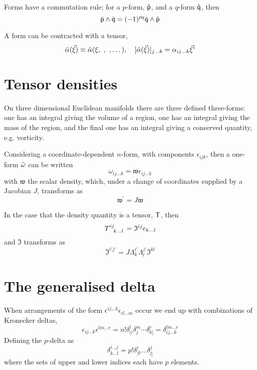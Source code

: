 Forms have a commutation rule; for a $p$-form, $\tilde{\mathsf{{p}}}$, and a
$q$-form $\tilde{\mathsf{{q}}}$, then
\begin{equation}
  \label{eq:35}
  \tilde{\mathsf{{p}}} \wedge \tilde{\mathsf{{q}}} = (-1)^{pq} \tilde{\mathsf{{q}}} \wedge \tilde{\mathsf{{p}}}
\end{equation}

A form can be contracted with a tensor,
\begin{equation}
  \label{eq:36}
  \tilde{\mathsf{{\alpha}}}(\vec{\xi}) \equiv \tilde{\mathsf{{\alpha}}}(\xi,\ , \ , \dots), \quad [\tilde{\mathsf{{\alpha}}}(\vec{\xi}) ]_{j\dots k} = \alpha_{ij \dots k} \vec{\xi}^i
\end{equation}

\section{Tensor densities}
\label{sec:tensor-densities}

On three dimensional Euclidean manifolds there are three defined
three-forms: one has an integral giving the volume of a region, one
has an integral giving the mass of the region, and the final one has
an integral giving a conserved quantity, e.g. vorticity.

Considering a coordinate-dependent $n$-form, with components
$\epsilon_{ijk}$, then a one-form $\tilde{\omega}$ can be written
\begin{equation}
  \label{eq:38}
  \omega_{ij\dots k} = \mathfrak{w} \epsilon_{ij\dots k}
\end{equation}
with $\mathfrak{w}$ the scalar density, which, under a change of
coordinates supplied by a Jacobian $J$, transforms as \[
\mathfrak{w}^{'} = J \mathfrak{w} \]

In the case that the density quantity is a tensor, $\mathsf{{T}}$, then
\[ T \indices{^{ij}_{k \dots l}} = \mathfrak{I}^{ij} \epsilon_{k \dots l} \]
and $\mathfrak{I}$ transforms as
\[ \mathfrak{I}^{i' j'} = J \Lambda^{i'}_k \Lambda^{j'}_l \mathfrak{I}^{kl} \]

\section{The generalised delta}
\label{sec:generalised-delta}

When arrangements of the form $\epsilon^{ij \dots k} \epsilon_{il\dots
  m}$ occur we end up with combinations of Kronecker deltas,
\begin{equation}
  \label{eq:39}
  \epsilon_{ij \dots k} \epsilon^{lm \dots r} =n! \delta^l_{[i} \delta^m_j \cdots \delta^r_{k]} = \delta^{lm \dots r}_{ij \dots k}
\end{equation}
Defining the $p$-delta as 
\begin{equation}
\label{eq:40}
\delta^{i \dots j}_{k \dots l} = p! \delta^i_{[k}\dots \delta^j_{l]}
\end{equation}
where the sets of upper and lower indices each have $p$ elements.

